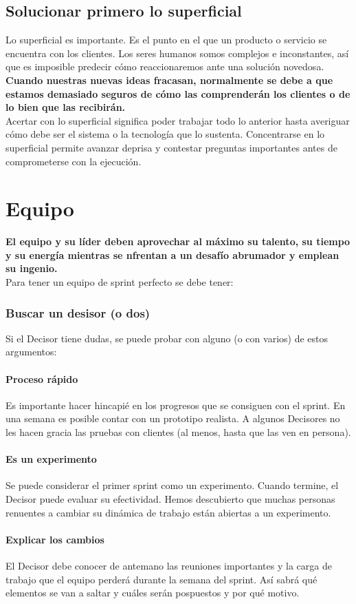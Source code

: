 \documentclass[10pt]{article}
\begin{document}
\begin{multicols}{2}
\subsection*{Solucionar primero lo superficial}
Lo superficial es importante. Es el punto en el que un producto o servicio se encuentra con los clientes. Los seres humanos somos complejos e inconstantes, así que es imposible predecir cómo reaccionaremos ante una solución novedosa. \textbf{Cuando nuestras nuevas ideas fracasan, normalmente se debe a que estamos demasiado seguros de cómo las comprenderán los clientes o de lo bien que las recibirán.}\\
Acertar con lo superficial significa poder trabajar todo lo anterior hasta averiguar cómo debe ser el sistema o la tecnología que lo sustenta. Concentrarse en lo superficial permite avanzar deprisa y contestar preguntas importantes antes de comprometerse con la ejecución.
\section*{Equipo}
\textbf{El equipo y su líder deben aprovechar al máximo su talento, su tiempo y su energía mientras se nfrentan a un desafío abrumador y emplean su ingenio.}\\
Para tener un equipo de sprint perfecto se debe tener:
\subsubsection*{Buscar un desisor (o dos)}
Si el Decisor tiene dudas, se puede probar con alguno (o con varios) de estos argumentos:
\paragraph*{Proceso rápido}
Es importante hacer hincapié en los progresos que se consiguen con el sprint. En una semana es posible contar con un prototipo realista. A algunos Decisores no les hacen gracia las pruebas con clientes (al menos, hasta que las ven en persona).
\paragraph*{Es un experimento}
Se puede considerar el primer sprint como un experimento. Cuando termine, el Decisor puede evaluar su efectividad. Hemos descubierto que muchas personas renuentes a cambiar su dinámica de trabajo están abiertas a un experimento.
\paragraph*{Explicar los cambios}
El Decisor debe conocer de antemano las reuniones importantes y la carga de trabajo que el equipo perderá durante la semana del sprint. Así sabrá qué elementos se van a saltar y cuáles serán pospuestos y por qué motivo.

\end{multicols}
\end{document}

